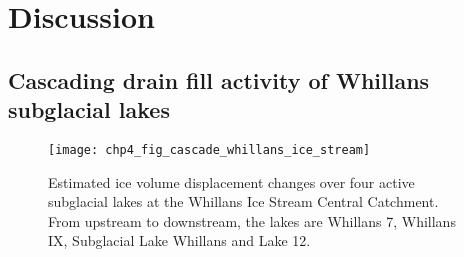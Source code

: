 %

%
%
%
%
%
%
%


\clearpage
\section{Discussion}

\subsection{Cascading drain fill activity of Whillans subglacial lakes} \label{sec:cascade}

\begin{figure}[htbp]
  \texttt{[image: chp4\_fig\_cascade\_whillans\_ice\_stream]}
  \caption[Ice Volume displacement over Whillans Ice Stream central catchment lakes]{
    Estimated ice volume displacement changes over four active subglacial lakes at the Whillans Ice Stream Central Catchment.
    From upstream to downstream, the lakes are Whillans 7, Whillans IX, Subglacial Lake Whillans and Lake 12.
  }
  \label{fig:cascade}
\end{figure}

